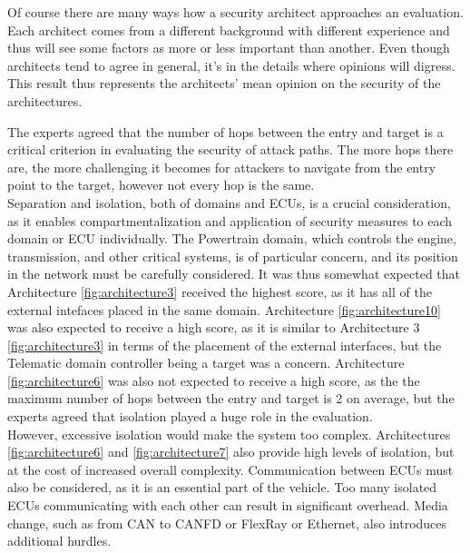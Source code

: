 Of course there are many ways how a security architect approaches an evaluation.
Each architect comes from a different background with different experience and thus will see some factors as more or less important than another.
Even though architects tend to agree in general, it's in the details where opinions will digress.
This result thus represents the architects' mean opinion on the security of the architectures. 

The experts agreed that the number of hops between the entry and target is a critical criterion in evaluating the security of attack paths. 
The more hops there are, the more challenging it becomes for attackers to navigate from the entry point to the target, however not every hop is the same.\\

Separation and isolation, both of domains and ECUs, is a crucial consideration, as it enables compartmentalization and application of security measures to each domain or ECU individually. 
The Powertrain domain, which controls the engine, transmission, and other critical systems, is of particular concern, and its position in the network must be carefully considered. 
It was thus somewhat expected that Architecture \ref{fig:architecture3} received the highest score, as it has all of the external intefaces placed in the same domain.
Architecture \ref{fig:architecture10} was also expected to receive a high score, as it is similar to Architecture 3 \ref{fig:architecture3} in terms of the placement of the external interfaces,
but the Telematic domain controller being a target was a concern.
Architecture \ref{fig:architecture6} was also not expected to receive a high score, as the the maximum number of hops between the entry and target is 2 on average,
but the experts agreed that isolation played a huge role in the evaluation.\\

However, excessive isolation would make the system too complex. 
Architectures \ref{fig:architecture6} and \ref{fig:architecture7} also provide high levels of isolation, but at the cost of increased overall complexity.
Communication between ECUs must also be considered, as it is an essential part of the vehicle. 
Too many isolated ECUs communicating with each other can result in significant overhead. 
Media change, such as from CAN to CANFD or FlexRay or Ethernet, also introduces additional hurdles.\\


